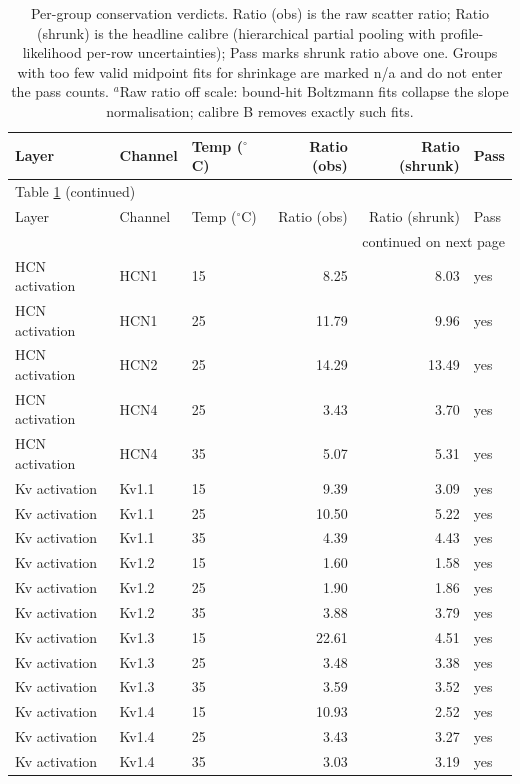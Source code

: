\begin{longtable}{lllrrl}
\caption{Per-group conservation verdicts. Ratio (obs) is the raw scatter ratio; Ratio (shrunk) is the headline calibre (hierarchical partial pooling with profile-likelihood per-row uncertainties); Pass marks shrunk ratio above one. Groups with too few valid midpoint fits for shrinkage are marked n/a and do not enter the pass counts. $^{a}$Raw ratio off scale: bound-hit Boltzmann fits collapse the slope normalisation; calibre B removes exactly such fits.}\label{tab:verdictlong}\\
\toprule
Layer & Channel & Temp ($^\circ$C) & Ratio (obs) & Ratio (shrunk) & Pass \\
\midrule
\endfirsthead
\multicolumn{6}{l}{\footnotesize Table \ref{tab:verdictlong} (continued)}\\
\toprule
Layer & Channel & Temp ($^\circ$C) & Ratio (obs) & Ratio (shrunk) & Pass \\
\midrule
\endhead
\midrule\multicolumn{6}{r}{\footnotesize continued on next page}\\
\endfoot
\bottomrule
\endlastfoot
HCN activation & HCN1 & 15 & 8.25 & 8.03 & yes \\
HCN activation & HCN1 & 25 & 11.79 & 9.96 & yes \\
HCN activation & HCN2 & 25 & 14.29 & 13.49 & yes \\
HCN activation & HCN4 & 25 & 3.43 & 3.70 & yes \\
HCN activation & HCN4 & 35 & 5.07 & 5.31 & yes \\
\midrule
Kv activation & Kv1.1 & 15 & 9.39 & 3.09 & yes \\
Kv activation & Kv1.1 & 25 & 10.50 & 5.22 & yes \\
Kv activation & Kv1.1 & 35 & 4.39 & 4.43 & yes \\
Kv activation & Kv1.2 & 15 & 1.60 & 1.58 & yes \\
Kv activation & Kv1.2 & 25 & 1.90 & 1.86 & yes \\
Kv activation & Kv1.2 & 35 & 3.88 & 3.79 & yes \\
Kv activation & Kv1.3 & 15 & 22.61 & 4.51 & yes \\
Kv activation & Kv1.3 & 25 & 3.48 & 3.38 & yes \\
Kv activation & Kv1.3 & 35 & 3.59 & 3.52 & yes \\
Kv activation & Kv1.4 & 15 & 10.93 & 2.52 & yes \\
Kv activation & Kv1.4 & 25 & 3.43 & 3.27 & yes \\
Kv activation & Kv1.4 & 35 & 3.03 & 3.19 & yes \\

\end{longtable}
